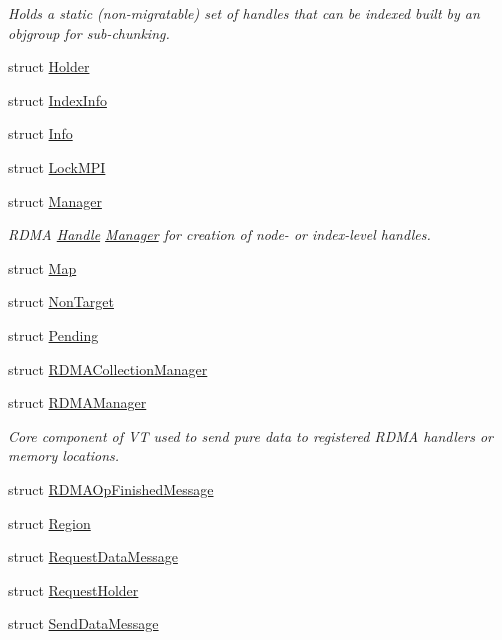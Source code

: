 \begin{DoxyCompactItemize}
\begin{DoxyCompactList}\small\item\em Holds a static (non-\/migratable) set of handles that can be indexed built by an objgroup for sub-\/chunking. \end{DoxyCompactList}\item 
struct \hyperlink{structvt_1_1rdma_1_1_holder}{Holder}
\item 
struct \hyperlink{structvt_1_1rdma_1_1_index_info}{Index\+Info}
\item 
struct \hyperlink{structvt_1_1rdma_1_1_info}{Info}
\item 
struct \hyperlink{structvt_1_1rdma_1_1_lock_m_p_i}{Lock\+M\+PI}
\item 
struct \hyperlink{structvt_1_1rdma_1_1_manager}{Manager}
\begin{DoxyCompactList}\small\item\em R\+D\+MA \hyperlink{structvt_1_1rdma_1_1_handle}{Handle} \hyperlink{structvt_1_1rdma_1_1_manager}{Manager} for creation of node-\/ or index-\/level handles. \end{DoxyCompactList}\item 
struct \hyperlink{structvt_1_1rdma_1_1_map}{Map}
\item 
struct \hyperlink{structvt_1_1rdma_1_1_non_target}{Non\+Target}
\item 
struct \hyperlink{structvt_1_1rdma_1_1_pending}{Pending}
\item 
struct \hyperlink{structvt_1_1rdma_1_1_r_d_m_a_collection_manager}{R\+D\+M\+A\+Collection\+Manager}
\item 
struct \hyperlink{structvt_1_1rdma_1_1_r_d_m_a_manager}{R\+D\+M\+A\+Manager}
\begin{DoxyCompactList}\small\item\em Core component of VT used to send pure data to registered R\+D\+MA handlers or memory locations. \end{DoxyCompactList}\item 
struct \hyperlink{structvt_1_1rdma_1_1_r_d_m_a_op_finished_message}{R\+D\+M\+A\+Op\+Finished\+Message}
\item 
struct \hyperlink{structvt_1_1rdma_1_1_region}{Region}
\item 
struct \hyperlink{structvt_1_1rdma_1_1_request_data_message}{Request\+Data\+Message}
\item 
struct \hyperlink{structvt_1_1rdma_1_1_request_holder}{Request\+Holder}
\item 
struct \hyperlink{structvt_1_1rdma_1_1_send_data_message}{Send\+Data\+Message}

\end{DoxyCompactItemize}
